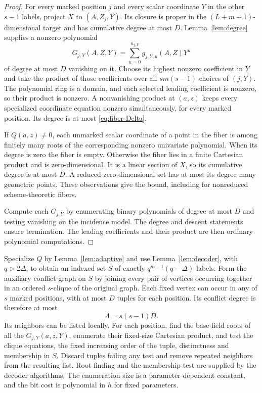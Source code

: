 \documentclass[11pt,a4paper]{article}
\theoremstyle{definition}
\theoremstyle{remark}
\numberwithin{equation}{section}
\begin{document}
\begin{proof}
For every marked position $j$ and every scalar coordinate $Y$ in the other $s-1$ labels, project $X$ to $(A,Z_j,Y)$. Its closure is proper in the $(L+m+1)$-dimensional target and has cumulative degree at most $D$. Lemma~\ref{lem:degree} supplies a nonzero polynomial
\[
G_{j,Y}(A,Z,Y)=\sum_{u=0}^{u_{j,Y}}g_{j,Y,u}(A,Z)Y^u
\]
of degree at most $D$ vanishing on it. Choose its highest nonzero coefficient in $Y$ and take the product of those coefficients over all $s m(s-1)$ choices of $(j,Y)$. The polynomial ring is a domain, and each selected leading coefficient is nonzero, so their product is nonzero. A nonvanishing product at $(a,z)$ keeps every specialized coordinate equation nonzero simultaneously, for every marked position. Its degree is at most \eqref{eq:fiber-Delta}.

If $Q(a,z)\ne0$, each unmarked scalar coordinate of a point in the fiber is among finitely many roots of the corresponding nonzero univariate polynomial. When its degree is zero the fiber is empty. Otherwise the fiber lies in a finite Cartesian product and is zero-dimensional. It is a linear section of $X$, so its cumulative degree is at most $D$. A reduced zero-dimensional set has at most its degree many geometric points. These observations give the bound, including for nonreduced scheme-theoretic fibers.

Compute each $G_{j,Y}$ by enumerating binary polynomials of degree at most $D$ and testing vanishing on the incidence model. The degree and descent statements ensure termination. The leading coefficients and their product are then ordinary polynomial computations.
\end{proof}

Specialize $Q$ by Lemma~\ref{lem:adaptive} and use Lemma~\ref{lem:decoder}, with $q>2\Delta$, to obtain an indexed set $S$ of exactly $q^{m-1}(q-\Delta)$ labels. Form the auxiliary conflict graph on $S$ by joining every pair of vertices occurring together in an ordered $s$-clique of the original graph. Each fixed vertex can occur in any of $s$ marked positions, with at most $D$ tuples for each position. Its conflict degree is therefore at most
\begin{equation}\label{eq:Lambda}
\Lambda=s(s-1)D.
\end{equation}
Its neighbors can be listed locally. For each position, find the base-field roots of all the $G_{j,Y}(a,z,Y)$, enumerate their fixed-size Cartesian product, and test the clique equations, the fixed increasing order of the tuple, distinctness and membership in $S$. Discard tuples failing any test and remove repeated neighbors from the resulting list. Root finding and the membership test are supplied by the decoder algorithms. The enumeration size is a parameter-dependent constant, and the bit cost is polynomial in $h$ for fixed parameters.
\end{document}
